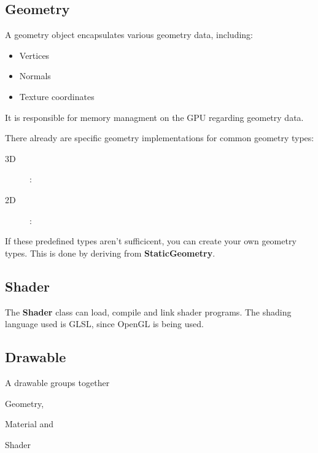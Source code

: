 \documentclass[12p, paper=a4, leqno, colorinlistoftodos]{article}
\newenvironment{packed_itemize}
{\begin{itemize}
		\setlength{\itemsep}{0pt}
		\setlength{\parskip}{0pt}
		\setlength{\parsep}{0pt}
	}{\end{itemize}}
\begin{document}
		\subsection{Geometry}
			A geometry object encapsulates various geometry data, including:
			\begin{itemize}
				\item Vertices
				\item Normals
				\item Texture coordinates
			\end{itemize}
			It is responsible for memory managment on the GPU regarding geometry data.
			
			There already are specific geometry implementations for common geometry types:
			\begin{description}
				\item[3D]: 
				\item[2D]:
			\end{description}
			If these predefined types aren't sufficicent, you can create your own geometry types. This is done by deriving from \textbf{StaticGeometry}.
			
			
		\subsection{Shader}
			The \textbf{Shader} class can load, compile and link shader programs. The shading language used is GLSL, since OpenGL is being used.
		
		\subsection{Drawable}
			A drawable groups together
			\begin{packed_itemize}
				\item Geometry,
				\item Material and
				\item Shader
			\end{packed_itemize}
		
\end{document}
